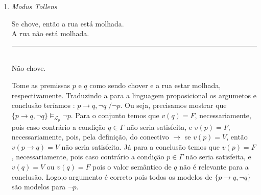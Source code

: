 \begin{enumerate}[label=\arabic*., left=0.5cm, align=left, nosep]
\begin{enumerate}[label=(\alph*), left=0.5cm, align=left, nosep]
                        Tome as premissas $p$ e $q$ como sendo chover e a rua estar molhada, respectivamente.
                        Traduzindo a para a linguagem proposicional os argumetos e conclusão teríamos : $p \to q, p \; / q$.
                        Ou seja, precisamos mostrar que $\{ p \to q, p \} \models_{\mathcal{L}_p}  q$. Para o conjunto temos que
                        $v(p) = V$, necessariamente, pois caso contrário a condição $p \in \Gamma$ não seria satisfeita, e 
                        $v(q) = V$, necessariamente, pois, pela definição, do conectivo $\to$ se $v(p) = V$, então $v(p \to q) = V$
                        sse $v(q) = V$. Já para a conclusão temos que $v(q) = V$, necessariamente, pois caso contrário a condição 
                        $q \in \Gamma$ não seria satisfeita, e $v(p) = V$ ou $v(q) = F$ pois o valor semântico de $p$ não é 
                        relevante para a conclusão. Logo, o argumento é correto pois todos os modelos de $\{p \to q, p\}$ são modelos
                        para $q$.

                    \item \textit{Modus Tollens}  
                        
                        Se chove, então a rua está molhada. \\ 
                        A rua não está molhada. \\ 
                        \rule{7cm}{0.4pt}\\
                        Não chove.
                    
                        Tome as premissas $p$ e $q$ como sendo chover e a rua estar molhada, respectivamente. Traduzindo a para a
                        linguagem proposicional os argumetos e conclusão teríamos : $p \to q, \neg q \; / \neg p$. Ou seja, 
                        precisamos mostrar que $\{ p \to q, \neg q \} \models_{\mathcal{L}_p} \neg p$. Para o conjunto temos que 
                        $v(q) = F$, necessariamente, pois caso contrário a condição $q \in \Gamma$ não seria satisfeita, e 
                        $v(p) = F$, necessariamente, pois, pela definição, do conectivo $\to$ se $v(p) = V$, então $v(p \to q) = V$ 
                        não seria satisfeita. Já para a conclusão temos que $v(p) = F$, necessariamente, pois caso contrário 
                        a condição $p \in \Gamma$ não seria satisfeita, e $v(q) = V$ ou $v(q) = F$ pois o valor semântico de $q$ não
                        é relevante para a conclusão. Logo,o argumento é correto pois todos os modelos de $\{p \to q, \neg q\}$ são 
                        modelos para $\neg p$.


\end{enumerate}
\end{enumerate}
